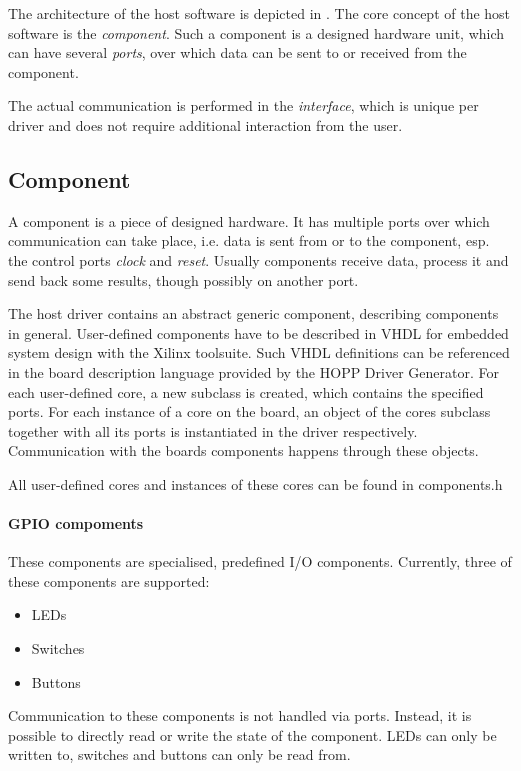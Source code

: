 \documentclass{report}
\begin{document}
The architecture of the host software is depicted in . The core concept of the host software is the \textit{component}. Such a component is a designed hardware unit, which can have several \textit{ports}, over which data can be sent to or received from the component.

The actual communication is performed in the \textit{interface}, which is unique per driver and does not require additional interaction from the user.

\subsection{Component}
A component is a piece of designed hardware. It has multiple ports over which communication can take place, i.e. data is sent from or to the component, esp. the control ports \textit{clock} and \textit{reset}. Usually components receive data, process it and send back some results, though possibly on another port.

The host driver contains an abstract generic component, describing components in general. User-defined components have to be described in VHDL for embedded system design with the Xilinx toolsuite. Such VHDL definitions can be referenced in the board description language provided by the HOPP Driver Generator. For each user-defined core, a new subclass is created, which contains the specified ports. For each instance of a core on the board, an object of the cores subclass together with all its ports is instantiated in the driver respectively. Communication with the boards components happens through these objects.

All user-defined cores and instances of these cores can be found in components.h

\paragraph{GPIO compoments}
These components are specialised, predefined I/O components. Currently, three of these components are supported:
\begin{itemize} \itemsep1pt \parskip0pt 
\item LEDs
\item Switches
\item Buttons
\end{itemize}
Communication to these components is not handled via ports. Instead, it is possible to directly read or write the state of the component. LEDs can only be written to, switches and buttons can only be read from.
\end{document}
